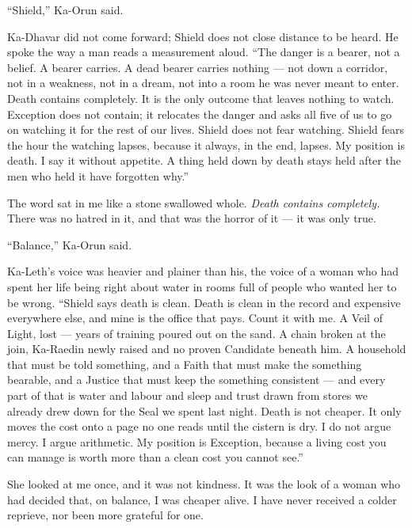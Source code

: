 ``Shield,'' Ka-Orun said.\par
 
Ka-Dhavar did not come forward; Shield does not close distance to be heard. He spoke the way a man reads a measurement aloud. ``The danger is a bearer, not a belief. A bearer carries. A dead bearer carries nothing — not down a corridor, not in a weakness, not in a dream, not into a room he was never meant to enter. Death contains completely. It is the only outcome that leaves nothing to watch. Exception does not contain; it relocates the danger and asks all five of us to go on watching it for the rest of our lives. Shield does not fear watching. Shield fears the hour the watching lapses, because it always, in the end, lapses. My position is death. I say it without appetite. A thing held down by death stays held after the men who held it have forgotten why.''\par
 
The word sat in me like a stone swallowed whole. \emph{Death contains completely.} There was no hatred in it, and that was the horror of it — it was only true.\par
 
``Balance,'' Ka-Orun said.\par
 
Ka-Leth's voice was heavier and plainer than his, the voice of a woman who had spent her life being right about water in rooms full of people who wanted her to be wrong. ``Shield says death is clean. Death is clean in the record and expensive everywhere else, and mine is the office that pays. Count it with me. A Veil of Light, lost — years of training poured out on the sand. A chain broken at the join, Ka-Raedin newly raised and no proven Candidate beneath him. A household that must be told something, and a Faith that must make the something bearable, and a Justice that must keep the something consistent — and every part of that is water and labour and sleep and trust drawn from stores we already drew down for the Seal we spent last night. Death is not cheaper. It only moves the cost onto a page no one reads until the cistern is dry. I do not argue mercy. I argue arithmetic. My position is Exception, because a living cost you can manage is worth more than a clean cost you cannot see.''\par
 
She looked at me once, and it was not kindness. It was the look of a woman who had decided that, on balance, I was cheaper alive. I have never received a colder reprieve, nor been more grateful for one.\par
 
